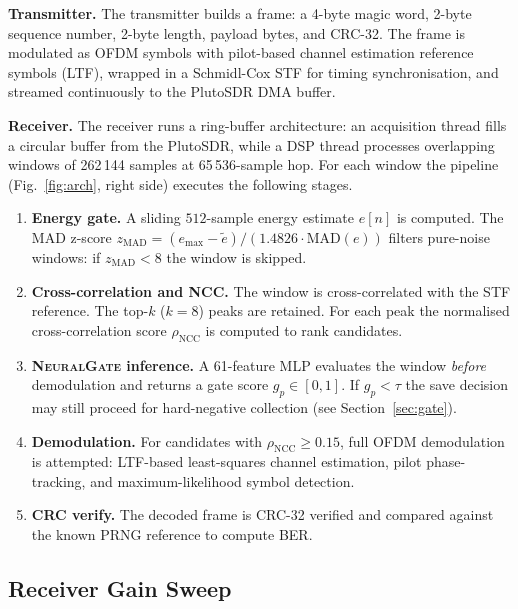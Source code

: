\documentclass[conference]{IEEEtran}
\newcommand{\gate}{\textsc{NeuralGate}}
\newcommand{\Gp}{g_p}
\newcommand{\Gz}{z_{\text{MAD}}}
\newcommand{\ncc}{\rho_{\text{NCC}}}
\begin{document}
\textbf{Transmitter.}
The transmitter builds a frame: a 4-byte magic word, 2-byte sequence
number, 2-byte length, payload bytes, and CRC-32.
The frame is modulated as OFDM symbols with pilot-based channel
estimation reference symbols (LTF), wrapped in a Schmidl-Cox STF for
timing synchronisation, and streamed continuously to the PlutoSDR DMA
buffer.

\textbf{Receiver.}
The receiver runs a ring-buffer architecture: an acquisition thread fills
a circular buffer from the PlutoSDR, while a DSP thread processes
overlapping windows of 262\,144 samples at 65\,536-sample hop.
For each window the pipeline (Fig.~\ref{fig:arch}, right side)
executes the following stages.

\begin{enumerate}
\item \textbf{Energy gate.}  A sliding $512$-sample energy estimate
  $e[n]$ is computed.  The MAD z-score
  $\Gz = (e_{\max} - \tilde{e}) / (1.4826 \cdot \text{MAD}(e))$
  filters pure-noise windows: if $\Gz < 8$ the window is skipped.

\item \textbf{Cross-correlation and NCC.}  The window is
  cross-correlated with the STF reference.  The top-$k$ ($k=8$) peaks
  are retained.  For each peak the normalised cross-correlation score
  $\ncc$ is computed to rank candidates.

\item \textbf{\gate{} inference.}  A 61-feature MLP evaluates the
  window \emph{before} demodulation and returns a gate score
  $\Gp \in [0,1]$.  If $\Gp < \tau$ the save decision may still
  proceed for hard-negative collection (see Section~\ref{sec:gate}).

\item \textbf{Demodulation.}  For candidates with $\ncc \geq 0.15$,
  full OFDM demodulation is attempted: LTF-based least-squares
  channel estimation, pilot phase-tracking, and maximum-likelihood
  symbol detection.

\item \textbf{CRC verify.}  The decoded frame is CRC-32 verified
  and compared against the known PRNG reference to compute BER.
\end{enumerate}

\subsection{Receiver Gain Sweep}
\label{sec:sweep}
\end{document}
